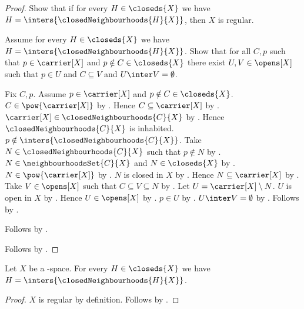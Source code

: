 \begin{proof}
    Show that if for every $H\in\closeds{X}$ we have
        $H=\inters{\closedNeighbourhoods{H}{X}}$, then $X$ is regular.
    \begin{subproof}
        Assume for every $H\in\closeds{X}$ we have
            $H=\inters{\closedNeighbourhoods{H}{X}}$.
        Show that for all $C,p$ such that $p\in\carrier[X]$ and
            $p\notin C\in\closeds{X}$ there exist $U,V\in\opens[X]$
            such that $p\in U$ and $C\subseteq V$ and
            $U\inter V=\emptyset$.
        \begin{subproof}
            Fix $C,p$.
            Assume $p\in\carrier[X]$ and $p\notin C\in\closeds{X}$.
            $C\in\pow{\carrier[X]}$ by .
            Hence $C\subseteq\carrier[X]$ by .
            $\carrier[X]\in\closedNeighbourhoods{C}{X}$
                by .
            Hence $\closedNeighbourhoods{C}{X}$ is inhabited.
            $p\notin\inters{\closedNeighbourhoods{C}{X}}$.
            Take $N\in\closedNeighbourhoods{C}{X}$ such that $p\notin N$
                by .
            $N\in\neighbourhoodsSet{C}{X}$ and $N\in\closeds{X}$
                by .
            $N\in\pow{\carrier[X]}$ by .
            $N$ is closed in $X$ by .
            Hence $N\subseteq\carrier[X]$ by .
            Take $V\in\opens[X]$ such that $C\subseteq V\subseteq N$
                by .
            Let $U=\carrier[X]\setminus N$.
            $U$ is open in $X$ by .
            Hence $U\in\opens[X]$ by .
            $p\in U$ by .
            $U\inter V=\emptyset$
                by .
            Follows by \auto.
        \end{subproof}
        Follows by .
    \end{subproof}
    Follows by \auto.
\end{proof}

\begin{corollary}\label{teethree_implies_closed_is_intersection_of_closed_neighbourhoods}
    Let $X$ be a \teethree-space.
    For every $H\in\closeds{X}$ we have
        $H=\inters{\closedNeighbourhoods{H}{X}}$.
\end{corollary}
\begin{proof}
    $X$ is regular by definition.
    Follows by
        .
\end{proof}


